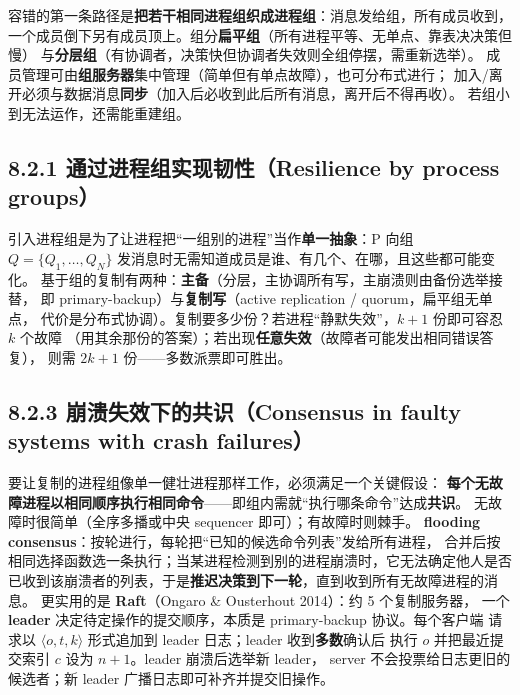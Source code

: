 
容错的第一条路径是\textbf{把若干相同进程组织成进程组}：消息发给组，所有成员收到，
一个成员倒下另有成员顶上。组分\textbf{扁平组}（所有进程平等、无单点、靠表决决策但慢）
与\textbf{分层组}（有协调者，决策快但协调者失效则全组停摆，需重新选举）。
成员管理可由\textbf{组服务器}集中管理（简单但有单点故障），也可分布式进行；
加入/离开必须与数据消息\textbf{同步}（加入后必收到此后所有消息，离开后不得再收）。
若组小到无法运作，还需能重建组。

\subsection*{8.2.1 通过进程组实现韧性（Resilience by process groups）}
引入进程组是为了让进程把“一组别的进程”当作\textbf{单一抽象}：P 向组
$Q = \{Q_1, \dots, Q_N\}$ 发消息时无需知道成员是谁、有几个、在哪，且这些都可能变化。
基于组的复制有两种：\textbf{主备}（分层，主协调所有写，主崩溃则由备份选举接替，
即 primary-backup）与\textbf{复制写}（active replication / quorum，扁平组无单点，
代价是分布式协调）。复制要多少份？若进程“静默失效”，$k+1$ 份即可容忍 $k$ 个故障
（用其余那份的答案）；若出现\textbf{任意失效}（故障者可能发出相同错误答复），
则需 $2k+1$ 份——多数派票即可胜出。

\begin{closeread}
\end{closeread}


\subsection*{8.2.3 崩溃失效下的共识（Consensus in faulty systems with crash failures）}
要让复制的进程组像单一健壮进程那样工作，必须满足一个关键假设：
\textbf{每个无故障进程以相同顺序执行相同命令}——即组内需就“执行哪条命令”达成\textbf{共识}。
无故障时很简单（全序多播或中央 sequencer 即可）；有故障时则棘手。
\textbf{flooding consensus}：按轮进行，每轮把“已知的候选命令列表”发给所有进程，
合并后按相同选择函数选一条执行；当某进程检测到别的进程崩溃时，它无法确定他人是否
已收到该崩溃者的列表，于是\textbf{推迟决策到下一轮}，直到收到所有无故障进程的消息。
更实用的是 \textbf{Raft}（Ongaro \& Ousterhout 2014）：约 5 个复制服务器，
一个 \textbf{leader} 决定待定操作的提交顺序，本质是 primary-backup 协议。每个客户端
请求以 $\langle o, t, k\rangle$ 形式追加到 leader 日志；leader 收到\textbf{多数}确认后
执行 $o$ 并把最近提交索引 $c$ 设为 $n+1$。leader 崩溃后选举新 leader，
server 不会投票给日志更旧的候选者；新 leader 广播日志即可补齐并提交旧操作。

